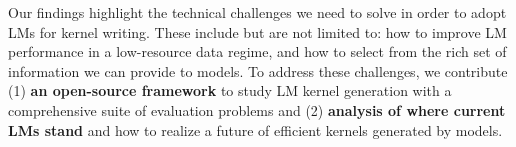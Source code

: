 \noindent Our findings highlight the technical challenges we need to solve in order to adopt LMs for kernel writing. These include but are not limited to: how to improve LM performance in a low-resource data regime, and how to select from the rich set of information we can provide to models. To address these challenges, we contribute (1) \textbf{an open-source framework} to study LM kernel generation with a comprehensive suite of evaluation problems and (2) \textbf{analysis of where current LMs stand} and how to realize a future of efficient kernels generated by models. 